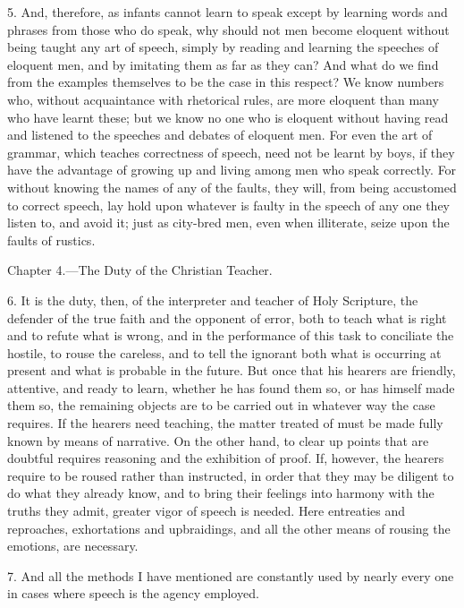 5. And, therefore, as infants cannot learn to speak except by learning words and phrases from those who do speak, why should not  men become eloquent without being taught any art of speech, simply by reading and learning the speeches of eloquent men, and by imitating them as far as they can? And what do we find from the examples themselves to be the case in this respect? We know numbers who, without acquaintance with rhetorical rules, are more eloquent than many who have learnt these; but we know no one who is eloquent without having read and listened to the speeches and debates of eloquent men. For even the art of grammar, which teaches correctness of speech, need not be learnt by boys, if they have the advantage of growing up and living among men who speak correctly. For without knowing the names of any of the faults, they will, from being accustomed to correct speech, lay hold upon whatever is faulty in the speech of any one they listen to, and avoid it; just as city-bred men, even when illiterate, seize upon the faults of rustics.


Chapter 4.—The Duty of the Christian Teacher.

6. It is the duty, then, of the interpreter and teacher of Holy Scripture, the defender of the true faith and the opponent of error, both to teach what is right and to refute what is wrong, and in the performance of this task to conciliate the hostile, to rouse the careless, and to tell the ignorant both what is occurring at present and what is probable in the future. But once that his hearers are friendly, attentive, and ready to learn, whether he has found them so, or has himself made them so, the remaining objects are to be carried out in whatever way the case requires. If the hearers need teaching, the matter treated of must be made fully known by means of narrative. On the other hand, to clear up points that are doubtful requires reasoning and the exhibition of proof. If, however, the hearers require to be roused rather than instructed, in order that they may be diligent to do what they already know, and to bring their feelings into harmony with the truths they admit, greater vigor of speech is needed. Here entreaties and reproaches, exhortations and upbraidings, and all the other means of rousing the emotions, are necessary.

7. And all the methods I have mentioned are constantly used by nearly every one in cases where speech is the agency employed.


